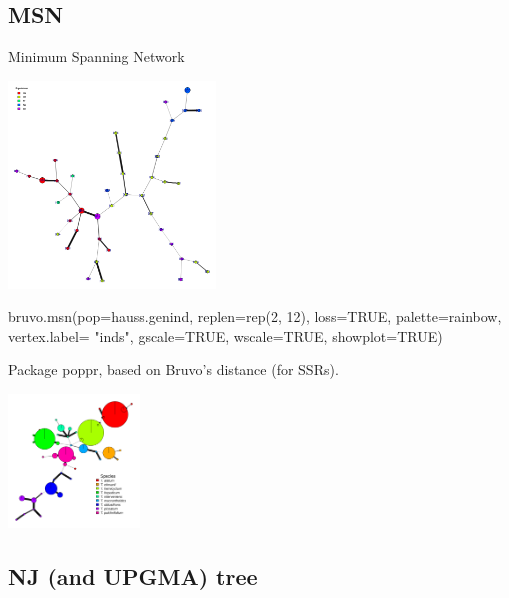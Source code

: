 \documentclass[compress, ucs, xelatex, 11pt, xcolor=svgnames,
  hyperref={
    bookmarks=true,
    unicode=true,
    colorlinks=true,
    pdftitle={Molecular data in R},
    plainpages=false,
    pdfauthor={Vojtech Zeisek},
    pdfsubject={Course about phylogeny and evolution in R},
    pdfcreator={XeLaTeX},
    pdfkeywords={R, evolution, phylogeny, molecular data},
    linkcolor=Tomato,
    anchorcolor=SaddleBrown,
    citecolor=Goldenrod,
    filecolor=DarkMagenta,
    menucolor=Sienna,
    urlcolor=DarkTurquoise,
    pdftex},
  url={hyphens, lowtilde} %
  ]{beamer}
\begin{document}
\subsection{MSN}

\begin{frame}[fragile]{Minimum Spanning Network}
\begin{multicols}{2}
  \includegraphics[height=5.5cm]{msn.png}
  \columnbreak
  \begin{spluscode}
    bruvo.msn(pop=hauss.genind,
      replen=rep(2, 12), loss=TRUE,
      palette=rainbow, vertex.label=
      "inds", gscale=TRUE,
      wscale=TRUE, showplot=TRUE)
  \end{spluscode}
  Package poppr, based on Bruvo's distance (for SSRs).
  \begin{center}
    \includegraphics[width=3.5cm]{msn-bruvo_no_labels.png}
  \end{center}
\end{multicols}
\end{frame}

\subsection{NJ (and UPGMA) tree}
\end{document}
